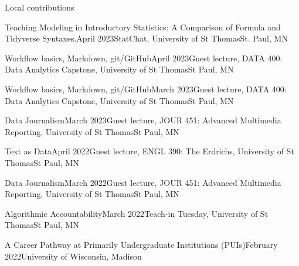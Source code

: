 \documentclass{resume} %
\begin{document}


\begin{rSection}{Local contributions}

\begin{sSubsection}{Teaching Modeling in Introductory Statistics: A Comparison of Formula and Tidyverse Syntaxes.}{}{April 2023}{StatChat, University of St Thomas}{St. Paul, MN}
\end{sSubsection}

\begin{sSubsection}{Workflow basics, Markdown, git/GitHub}{}{April 2023}{Guest lecture, DATA 400: Data Analytics Capstone, University of St Thomas}{St Paul, MN}
\end{sSubsection}


\begin{sSubsection}{Workflow basics, Markdown, git/GitHub}{}{March 2023}{Guest lecture, DATA 400: Data Analytics Capstone, University of St Thomas}{St Paul, MN}
\end{sSubsection}

\begin{sSubsection}{Data Journalism}{}{March 2023}{Guest lecture, JOUR 451: Advanced Multimedia Reporting, University of St Thomas}{St Paul, MN}
\end{sSubsection}

\begin{sSubsection}{Text as Data}{}{April 2022}{Guest lecture, ENGL 390: The Erdrichs, University of St Thomas}{St Paul, MN}
\end{sSubsection}

\begin{sSubsection}{Data Journalism}{}{March 2022}{Guest lecture, JOUR 451: Advanced Multimedia Reporting, University of St Thomas}{St Paul, MN}
\end{sSubsection}

\begin{sSubsection}{Algorithmic Accountability}{}{March 2022}{Teach-in Tuesday, University of St Thomas}{St Paul, MN}
\end{sSubsection}

\begin{sSubsection}{A Career Pathway at Primarily Undergraduate Institutions (PUIs)}{}{February 2022}{University of Wisconsin, Madison}{}
\end{sSubsection}


\end{rSection}
\end{document}
